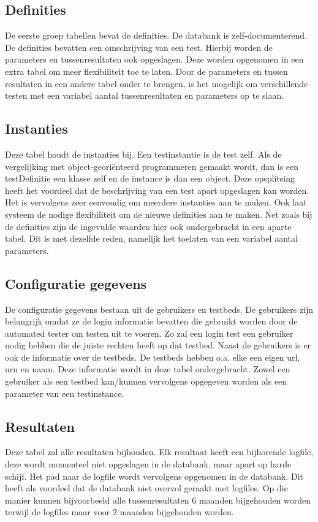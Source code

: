 \subsection{Definities}
\npar
De eerste groep tabellen bevat de definities. De databank is zelf-documenterend. De definities bevatten een omschrijving van een test. Hierbij worden de parameters en tussenresultaten ook opgeslagen. Deze worden opgenomen in een extra tabel om meer flexibiliteit toe te laten. Door de parameters en tussen resultaten in een andere tabel onder te brengen, is het mogelijk om verschillende testen met een variabel aantal tussenresultaten en parameters op te slaan.
\subsection{Instanties}
\npar
Deze tabel houdt de instanties bij. Een testinstantie is de test zelf. Als de vergelijking met object-geori\"enteerd programmeren gemaakt wordt, dan is een testDefinitie een klasse zelf en de instance is dan een object. Deze opsplitsing heeft het voordeel dat de beschrijving van een test apart opgeslagen kan worden. Het is vervolgens zeer eenvoudig om meerdere instanties aan te maken. Ook laat systeem de nodige flexibiliteit om de nieuwe definities aan te maken. Net zoals bij de definities zijn de ingevulde waarden hier ook ondergebracht in een aparte tabel. Dit is met dezelfde reden, namelijk het toelaten van een variabel aantal parameters.
\subsection{Configuratie gegevens}
\npar
De configuratie gegevens bestaan uit de gebruikers en testbeds. De gebruikers zijn belangrijk omdat ze de login informatie bevatten die gebruikt worden door de automated tester om testen uit te voeren. Zo zal een login test een gebruiker nodig hebben die de juiste rechten heeft op dat testbed.
Naast de gebruikers is er ook de informatie over de testbeds. De testbeds hebben o.a. elke een eigen url, urn en naam. Deze informatie wordt in deze tabel ondergebracht. Zowel een gebruiker als een testbed kan/kunnen vervolgens opgegeven worden als een parameter van een testinstance. 
\subsection{Resultaten}
\npar
Deze tabel zal alle resultaten bijhouden. Elk resultaat heeft een bijhorende logfile, deze wordt momenteel niet opgeslagen in de databank, maar apart op harde schijf. Het pad naar de logfile wordt vervolgens opgenomen in de databank. Dit heeft als voordeel dat de databank niet overvol geraakt met logfiles. Op die manier kunnen bijvoorbeeld alle tussenresultaten 6 maanden bijgehouden worden terwijl de logfiles maar voor 2 maanden bijgehouden worden.
\clearpage
